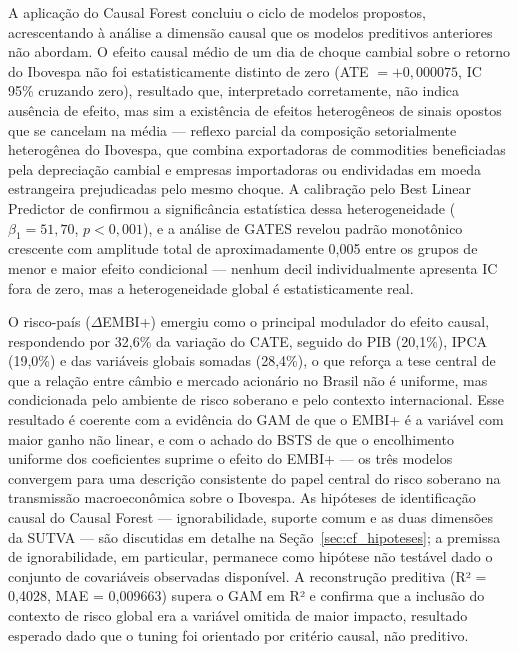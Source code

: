\documentclass[	12pt, Times, openright, oneside, a4paper, english, brazil]{abntex2}
\begin{document}
A aplicação do Causal Forest concluiu o ciclo de modelos propostos, acrescentando à análise a dimensão causal que os modelos preditivos anteriores não abordam. O efeito causal médio de um dia de choque cambial sobre o retorno do Ibovespa não foi estatisticamente distinto de zero (ATE $= +0{,}000075$, IC 95\% cruzando zero), resultado que, interpretado corretamente, não indica ausência de efeito, mas sim a existência de efeitos heterogêneos de sinais opostos que se cancelam na média — reflexo parcial da composição setorialmente heterogênea do Ibovespa, que combina exportadoras de commodities beneficiadas pela depreciação cambial e empresas importadoras ou endividadas em moeda estrangeira prejudicadas pelo mesmo choque. A calibração pelo Best Linear Predictor de  confirmou a significância estatística dessa heterogeneidade ($\beta_1 = 51{,}70$, $p < 0{,}001$), e a análise de GATES revelou padrão monotônico crescente com amplitude total de aproximadamente 0{,}005 entre os grupos de menor e maior efeito condicional — nenhum decil individualmente apresenta IC fora de zero, mas a heterogeneidade global é estatisticamente real.

O risco-país ($\Delta$EMBI+) emergiu como o principal modulador do efeito causal, respondendo por 32,6\% da variação do CATE, seguido do PIB (20,1\%), IPCA (19,0\%) e das variáveis globais somadas (28,4\%), o que reforça a tese central de que a relação entre câmbio e mercado acionário no Brasil não é uniforme, mas condicionada pelo ambiente de risco soberano e pelo contexto internacional. Esse resultado é coerente com a evidência do GAM de que o EMBI+ é a variável com maior ganho não linear, e com o achado do BSTS de que o encolhimento uniforme dos coeficientes suprime o efeito do EMBI+ — os três modelos convergem para uma descrição consistente do papel central do risco soberano na transmissão macroeconômica sobre o Ibovespa. As hipóteses de identificação causal do Causal Forest — ignorabilidade, suporte comum e as duas dimensões da SUTVA — são discutidas em detalhe na Seção~\ref{sec:cf_hipoteses}; a premissa de ignorabilidade, em particular, permanece como hipótese não testável dado o conjunto de covariáveis observadas disponível. A reconstrução preditiva (R² = 0{,}4028, MAE = 0{,}009663) supera o GAM em R² e confirma que a inclusão do contexto de risco global era a variável omitida de maior impacto, resultado esperado dado que o tuning foi orientado por critério causal, não preditivo.
\end{document}
